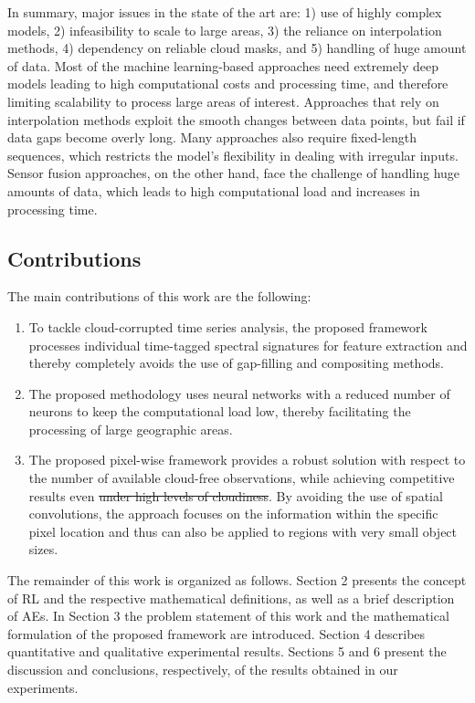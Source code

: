\documentclass[journal,article,submit,pdftex,moreauthors]{Definitions/mdpi}
\providecommand{\DIFadd}[1]{{\protect\color{blue}\uwave{#1}}} %
\providecommand{\DIFdel}[1]{{\protect\color{red}\sout{#1}}}                      %
\providecommand{\DIFaddbegin}{} %
\providecommand{\DIFaddend}{} %
\providecommand{\DIFdelbegin}{} %
\providecommand{\DIFdelend}{} %
\begin{document}
In summary, major issues in the state of the art are: 1) use of highly complex models, 2) infeasibility to scale to large areas, 3) the reliance on interpolation methods, 4) dependency on reliable cloud masks, and 5) handling of huge amount of data. Most of the machine learning-based approaches need extremely deep models leading to high computational costs and processing time, and therefore limiting scalability to process large areas of interest. Approaches that rely on interpolation methods exploit the smooth changes between data points, but fail if data gaps become overly long. Many approaches also require fixed-length sequences, which restricts the model's flexibility in dealing with irregular inputs. Sensor fusion approaches, on the other hand, face the challenge of handling huge amounts of data, which leads to high computational load and increases in processing time. 

\subsection{Contributions}
The main contributions of this work are the following:
\begin{enumerate}
	\item To tackle cloud-corrupted time series analysis, the proposed framework processes individual time-tagged spectral signatures for feature extraction and thereby completely avoids the use of gap-filling and compositing methods.
	\item The proposed methodology uses neural networks with a reduced number of neurons to keep the computational load low, thereby facilitating the processing of large geographic areas.
	\item The proposed pixel-wise framework provides a robust solution with respect to the number of available cloud-free observations, while achieving competitive results even \DIFdelbegin \DIFdel{under high levels of cloudiness}\DIFdelend \DIFaddbegin \DIFadd{when limited observations are available}\DIFaddend . By avoiding the use of spatial convolutions, the approach focuses on the information within the specific pixel location and thus can also be applied to regions with very small object sizes. 
\end{enumerate}

The remainder of this work is organized as follows. Section 2 presents the concept of RL and the respective mathematical definitions, as well as a brief description of AEs. 
In Section 3 the problem statement of this work and the mathematical formulation of the proposed framework are introduced. 
Section 4 describes quantitative and qualitative experimental results. 
Sections 5 and 6 present the discussion and conclusions, respectively, of the results obtained in our experiments.
\end{document}
